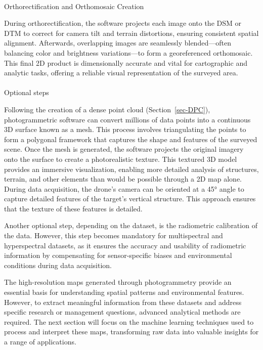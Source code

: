 \documentclass[
  letterpaper,
  11pt,
  english,
  singlespacing,
  headsepline]{MastersDoctoralThesis}
\makeatletter
\let\oldparagraph\paragraph
\renewcommand{\paragraph}{
    \@ifstar
      \xxxParagraphStar
      \xxxParagraphNoStar
  }
\newcommand{\xxxParagraphStar}[1]{\oldparagraph*{#1}\mbox{}}
\newcommand{\xxxParagraphNoStar}[1]{\oldparagraph{#1}\mbox{}}
\makeatother
\begin{document}
\begin{spacing}{1.5}
\begin{figure}
\end{figure}%

\paragraph{Orthorectification and Orthomosaic
Creation}\label{orthorectification-and-orthomosaic-creation}

During orthorectification, the software projects each image onto the DSM
or DTM to correct for camera tilt and terrain distortions, ensuring
consistent spatial alignment. Afterwards, overlapping images are
seamlessly blended---often balancing color and brightness
variations---to form a georeferenced orthomosaic. This final 2D product
is dimensionally accurate and vital for cartographic and analytic tasks,
offering a reliable visual representation of the surveyed area.

\paragraph{Optional steps}\label{optional-steps}

Following the creation of a dense point cloud (Section~\ref{sec-DPC}),
photogrammetric software can convert millions of data points into a
continuous 3D surface known as a mesh. This process involves
triangulating the points to form a polygonal framework that captures the
shape and features of the surveyed scene. Once the mesh is generated,
the software projects the original imagery onto the surface to create a
photorealistic texture. This textured 3D model provides an immersive
visualization, enabling more detailed analysis of structures, terrain,
and other elements than would be possible through a 2D map alone. During
data acquisition, the drone's camera can be oriented at a 45° angle to
capture detailed features of the target's vertical structure. This
approach ensures that the texture of these features is detailed.

Another optional step, depending on the dataset, is the radiometric
calibration of the data. However, this step becomes mandatory for
multispectral and hyperspectral datasets, as it ensures the accuracy and
usability of radiometric information by compensating for sensor-specific
biases and environmental conditions during data acquisition.

\begin{tcolorbox}
The high-resolution maps generated through photogrammetry provide an essential basis for understanding spatial patterns and environmental features. However, to extract meaningful information from these datasets and address specific research or management questions, advanced analytical methods are required. The next section will focus on the machine learning techniques used to process and interpret these maps, transforming raw data into valuable insights for a range of applications.
\end{tcolorbox}


\end{spacing}
\end{document}
